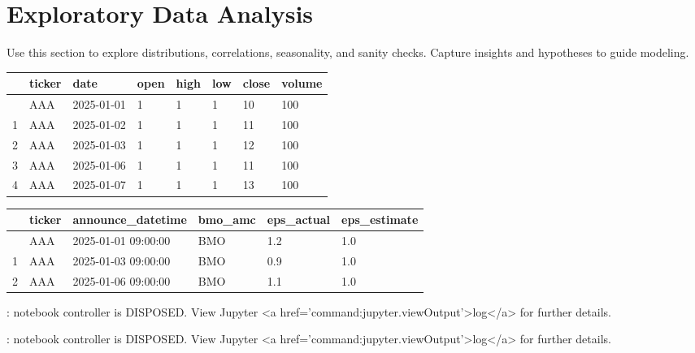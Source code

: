 \documentclass[
  letterpaper,
  DIV=11,
  numbers=noendperiod]{scrartcl}
\begin{document}
\section{Exploratory Data Analysis}\label{exploratory-data-analysis}

Use this section to explore distributions, correlations, seasonality,
and sanity checks. Capture insights and hypotheses to guide modeling.

\begin{longtable}[]{@{}llllllll@{}}
\toprule\noalign{}
& ticker & date & open & high & low & close & volume \\
\midrule\noalign{}
\endhead
\bottomrule\noalign{}
\endlastfoot
0 & AAA & 2025-01-01 & 1 & 1 & 1 & 10 & 100 \\
1 & AAA & 2025-01-02 & 1 & 1 & 1 & 11 & 100 \\
2 & AAA & 2025-01-03 & 1 & 1 & 1 & 12 & 100 \\
3 & AAA & 2025-01-06 & 1 & 1 & 1 & 11 & 100 \\
4 & AAA & 2025-01-07 & 1 & 1 & 1 & 13 & 100 \\
\end{longtable}

\begin{longtable}[]{@{}llllll@{}}
\toprule\noalign{}
& ticker & announce\_datetime & bmo\_amc & eps\_actual &
eps\_estimate \\
\midrule\noalign{}
\endhead
\bottomrule\noalign{}
\endlastfoot
0 & AAA & 2025-01-01 09:00:00 & BMO & 1.2 & 1.0 \\
1 & AAA & 2025-01-03 09:00:00 & BMO & 0.9 & 1.0 \\
2 & AAA & 2025-01-06 09:00:00 & BMO & 1.1 & 1.0 \\
\end{longtable}

\begin{Highlighting}
\textcolor{black}{: }
\textcolor{black}{}\textcolor{QuartoInternalColor1}{notebook controller is DISPOSED. }
\textcolor{QuartoInternalColor1}{}\textcolor{QuartoInternalColor1}{View Jupyter <a href='command:jupyter.viewOutput'>log</a> for further details.}
\end{Highlighting}

\begin{Highlighting}
\textcolor{black}{: }
\textcolor{black}{}\textcolor{QuartoInternalColor1}{notebook controller is DISPOSED. }
\textcolor{QuartoInternalColor1}{}\textcolor{QuartoInternalColor1}{View Jupyter <a href='command:jupyter.viewOutput'>log</a> for further details.}
\end{Highlighting}
\end{document}
